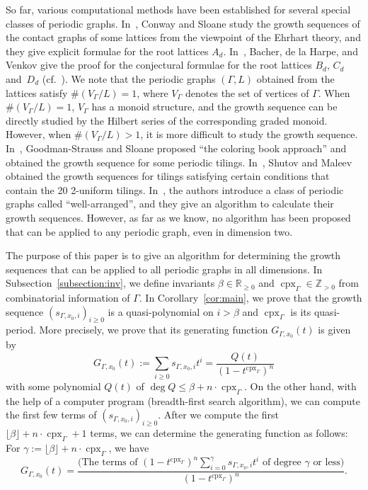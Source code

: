 \documentclass[11pt]{article}
\theoremstyle{definition}
\numberwithin{equation}{section}
\begin{document}
So far, various computational methods have been established for several special classes of periodic graphs. 
In~\cite{CS97}, Conway and Sloane study the growth sequences of the contact graphs of some lattices from the viewpoint of the Ehrhart theory, and they give explicit formulae for the root lattices $A_d$. 
In~\cite{BHV99}, Bacher, de la Harpe, and Venkov give the proof for the conjectural formulae for the root lattices $B_d$, $C_d$ and~$D_d$ (cf.\ \cite{ABHPS}). 
We note that the periodic graphs $(\Gamma, L)$ obtained from the lattices satisfy $\# (V_{\Gamma} /L) = 1$, where $V_{\Gamma}$ denotes the set of vertices of $\Gamma$. 
When $\# (V_{\Gamma} /L) = 1$, $V_{\Gamma}$ has a monoid structure, and the growth sequence can be directly studied by the Hilbert series of the corresponding graded monoid. 
However, when $\# (V_{\Gamma} /L) > 1$, it is more difficult to study the growth sequence. 
In~\cite{GS19}, Goodman-Strauss and Sloane proposed ``the coloring book approach'' 
and obtained the growth sequence for some periodic tilings. 
In~\cite{SM19, SM20a}, Shutov and Maleev obtained the growth sequences for 
tilings satisfying certain conditions that contain the 20 2-uniform tilings. 
In~\cite{IN}, the authors introduce a class of periodic graphs called ``well-arranged'', and they give an algorithm to calculate their growth sequences. However, as far as we know, no algorithm has been proposed that can be applied to any periodic graph, even in dimension two. 

The purpose of this paper is to give an algorithm for determining 
the growth sequences that can be applied to all periodic graphs in all dimensions. 
In Subsection~\ref{subsection:inv}, we define invariants $\beta \in \mathbb{R}_{\ge 0}$ and 
$\operatorname{cpx}_{\Gamma} \in \mathbb{Z}_{>0}$ from combinatorial information of $\Gamma$. 
In Corollary~\ref{cor:main}, we prove that the growth sequence $(s_{\Gamma, x_0, i})_{i \ge 0}$ is a quasi-polynomial on 
$i > \beta$ and $\operatorname{cpx}_{\Gamma}$ is its quasi-period.  
More precisely, we prove that its generating function $G_{\Gamma, x_0}(t)$ is given by 
\[
G_{\Gamma, x_0}(t) := \sum _{i \ge 0} s_{\Gamma, x_0, i} t^i = \frac{Q(t)}{(1-t^{\operatorname{cpx}_{\Gamma}}) ^n}
\]
with some polynomial $Q(t)$ of $\deg Q \le \beta + n \cdot \operatorname{cpx}_{\Gamma}$. 
On the other hand, with the help of a computer program (breadth-first search algorithm), 
we can compute the first few terms of $(s_{\Gamma, x_0, i})_{i \ge 0}$. 
After we compute the first $\lfloor \beta \rfloor + n \cdot \operatorname{cpx}_{\Gamma} + 1$ terms, 
we can determine the generating function as follows: For $\gamma := \lfloor \beta \rfloor + n \cdot \operatorname{cpx}_{\Gamma}$, 
we have 
\[
G_{\Gamma, x_0}(t) = \frac{\bigl( \text{The terms of $(1-t^{\operatorname{cpx}_{\Gamma}}) ^n \sum _{i = 0} ^{\gamma} s_{\Gamma, x_0, i} t^i$ of degree $\gamma$ or less}\bigr)}{(1-t^{\operatorname{cpx}_{\Gamma}}) ^n}. 
\]
\end{document}

